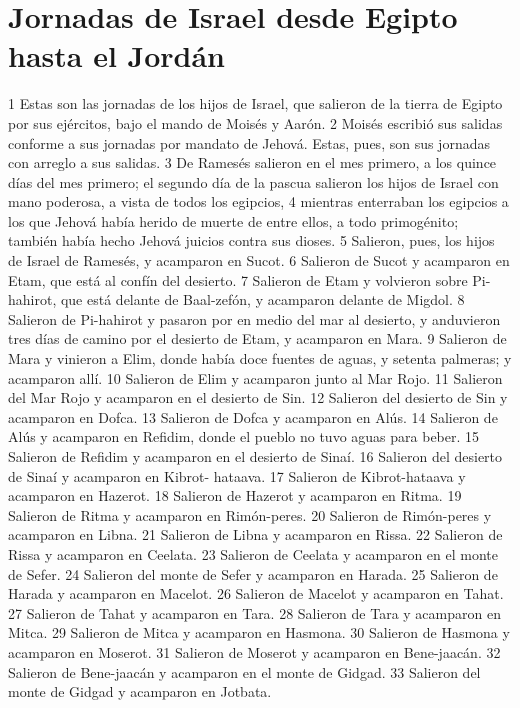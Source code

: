 \section*{Jornadas de Israel desde Egipto hasta el Jordán}


1 Estas son las jornadas de los hijos de Israel, que salieron de la tierra de Egipto por sus ejércitos, bajo el mando de Moisés y Aarón.
2 Moisés escribió sus salidas conforme a sus jornadas por mandato de Jehová. Estas, pues, son sus jornadas con arreglo a sus salidas.
3 De Ramesés salieron en el mes primero, a los quince días del mes primero; el segundo día de la pascua salieron los hijos de Israel con mano poderosa, a vista de todos los egipcios,
4 mientras enterraban los egipcios a los que Jehová había herido de muerte de entre ellos, a todo primogénito; también había hecho Jehová juicios contra sus dioses.
5 Salieron, pues, los hijos de Israel de Ramesés, y acamparon en Sucot.
6 Salieron de Sucot y acamparon en Etam, que está al confín del desierto.
7 Salieron de Etam y volvieron sobre Pi-hahirot, que está delante de Baal-zefón, y acamparon delante de Migdol.
8 Salieron de Pi-hahirot y pasaron por en medio del mar al desierto, y anduvieron tres días de camino por el desierto de Etam, y acamparon en Mara.
9 Salieron de Mara y vinieron a Elim, donde había doce fuentes de aguas, y setenta palmeras; y acamparon allí.
10 Salieron de Elim y acamparon junto al Mar Rojo.
11 Salieron del Mar Rojo y acamparon en el desierto de Sin.
12 Salieron del desierto de Sin y acamparon en Dofca.
13 Salieron de Dofca y acamparon en Alús.
14 Salieron de Alús y acamparon en Refidim, donde el pueblo no tuvo aguas para beber.
15 Salieron de Refidim y acamparon en el desierto de Sinaí.
16 Salieron del desierto de Sinaí y acamparon en Kibrot- hataava.
17 Salieron de Kibrot-hataava y acamparon en Hazerot.
18 Salieron de Hazerot y acamparon en Ritma.
19 Salieron de Ritma y acamparon en Rimón-peres.
20 Salieron de Rimón-peres y acamparon en Libna.
21 Salieron de Libna y acamparon en Rissa.
22 Salieron de Rissa y acamparon en Ceelata.
23 Salieron de Ceelata y acamparon en el monte de Sefer.
24 Salieron del monte de Sefer y acamparon en Harada.
25 Salieron de Harada y acamparon en Macelot.
26 Salieron de Macelot y acamparon en Tahat.
27 Salieron de Tahat y acamparon en Tara.
28 Salieron de Tara y acamparon en Mitca.
29 Salieron de Mitca y acamparon en Hasmona.
30 Salieron de Hasmona y acamparon en Moserot.
31 Salieron de Moserot y acamparon en Bene-jaacán.
32 Salieron de Bene-jaacán y acamparon en el monte de Gidgad.
33 Salieron del monte de Gidgad y acamparon en Jotbata.

